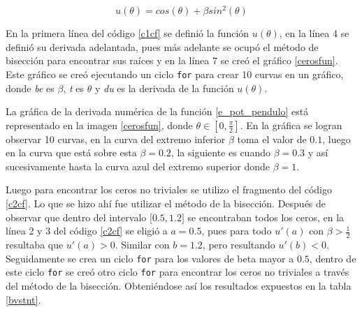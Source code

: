 \documentclass[../portafolio.tex]{subfiles}
\begin{document}
\begin{equation}
    u(\theta)=cos(\theta) + \beta sin^2(\theta) \label{e_pot_pendulo}
\end{equation}

En la primera línea del código \ref{c1cf} se definió la función $u(\theta)$, en la línea 4 se definió su derivada adelantada, pues más adelante se ocupó el método de bisección para encontrar sus raíces y en la línea 7 se creó el gráfico \ref{cerosfun}. Este gráfico se creó ejecutando un ciclo \texttt{for} para crear 10 curvas en un gráfico, donde \textit{be} es $\beta$, \textit{t} es $\theta$ y \textit{du} es la derivada de la función $u(\theta)$.

\vspace{2mm}
La gráfica de la derivada numérica de la función \ref{e_pot_pendulo} está representado en la imagen \ref{cerosfun}, donde $\theta \in [0,\frac{\pi}{2}]$. En la gráfica se logran observar 10 curvas, en la curva del extremo inferior $\beta$ toma el valor de $0.1$, luego en la curva que está sobre esta $\beta = 0.2$, la siguiente es cuando $\beta =0.3$ y así sucesivamente hasta la curva azul del extremo superior donde $\beta= 1$. 


Luego para encontrar los ceros no triviales se utilizo el fragmento del código \ref{c2cf}. Lo que se hizo ahí fue utilizar el método de la bisección. Después de observar que dentro del intervalo $[0$.$5,1$.$2]$ se encontraban todos los ceros, en la línea 2 y 3 del código \ref{c2cf} se eligió a $a=0$.$5$, pues para todo $u'(a)$ con $\beta>\frac{1}{2}$ resultaba que $u'(a)>0$. Similar con $b=1$.$2$, pero resultando $u'(b)<0$. Seguidamente se crea un ciclo \texttt{for} para los valores de beta mayor a $0.5$, dentro de este ciclo \texttt{for} se creó otro ciclo \texttt{for} para encontrar los ceros no triviales a través del método de la bisección. Obteniéndose así los resultados expuestos en la tabla \ref{bvstnt}. 
\end{document}
